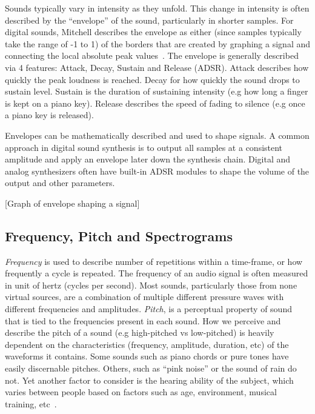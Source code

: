 \documentclass[\main/thesis.tex]{subfiles}
\begin{document}
Sounds typically vary in intensity as they unfold. This change in intensity is often described by the \enquote{envelope} of the sound, particularly in shorter samples. For digital sounds, Mitchell describes the envelope as either (since samples typically take the range of -1 to 1) of the borders that are created by graphing a signal and connecting the local absolute peak values~\cite{mitchell2009basicsynthChap6}. The envelope is generally described via 4 features: Attack, Decay, Sustain and Release (ADSR). Attack describes how quickly the peak loudness is reached. Decay for how quickly the sound drops to sustain level. Sustain is the duration of sustaining intensity (e.g how long a finger is kept on a piano key). Release describes the speed of fading to silence (e.g once a piano key is released).

Envelopes can be mathematically described and used to shape signals. A common approach in digital sound synthesis is to output all samples at a consistent amplitude and apply an envelope later down the synthesis chain. Digital and analog synthesizers often have built-in ADSR modules to shape the volume of the output and other parameters.  

[Graph of envelope shaping a signal]
\subsection{Frequency, Pitch and Spectrograms}
\textit{Frequency} is used to describe number of repetitions within a time-frame, or how frequently a cycle is repeated. The frequency of an audio signal is often measured in unit of hertz (cycles per second). Most sounds, particularly those from none virtual sources, are a combination of multiple different pressure waves with different frequencies and amplitudes. \textit{Pitch}, is a perceptual property of sound that is tied to the frequencies present in each sound. How we perceive and describe the pitch of a sound (e.g high-pitched vs low-pitched) is heavily dependent on the characteristics (frequency, amplitude, duration, etc) of the waveforms it contains. Some sounds such as piano chords or pure tones have easily discernable pitches. Others, such as \enquote{pink noise} or the sound of rain do not. Yet another factor to consider is the hearing ability of the subject, which varies between people based on factors such as age, environment, musical training, etc~\cite{reiss2016meta,alain2007age,newman2012grm7}. 
\end{document}
